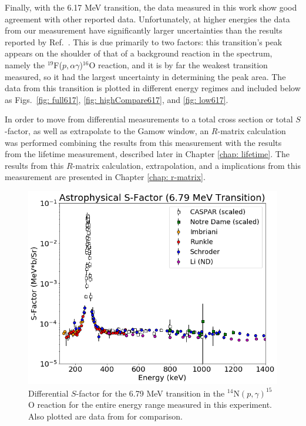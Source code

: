 Finally, with the 6.17 MeV transition, the data measured in this work show good agreement with other reported data. Unfortunately, at higher energies the data from our measurement have significantly larger uncertainties than the results reported by Ref.\ \cite{Schroder1987}. This is due primarily to two factors: this transition's peak appears on the shoulder of that of a background reaction in the spectrum, namely the $^{19}$F($p,\alpha \gamma$)$^{16}$O reaction, and it is by far the weakest transition measured, so it had the largest uncertainty in determining the peak area. The data from this transition is plotted in different energy regimes and included below as Figs.\ \ref{fig: full617}, \ref{fig: highCompare617}, and \ref{fig: low617}.

In order to move from differential measurements to a total cross section or total $S$-factor, as well as extrapolate to the Gamow window, an $R$-matrix calculation was performed combining the results from this measurement with the results from the lifetime measurement, described later in Chapter \ref{chap: lifetime}. The results from this $R$-matrix calculation, extrapolation, and a implications from this measurement are presented in Chapter \ref{chap: r-matrix}.





\begin{figure}
		\includegraphics[width=1.0\linewidth]{figures/full679.png}
	\caption{Differential $S$-factor for the 6.79 MeV transition in the $^{14}$N$\left( p,\gamma \right) ^{15}$O reaction for the entire energy range measured in this experiment. Also plotted are data from \cite{Schroder1987, Imbriani2005, Runkle2005, Li2016} for comparison.  }
	\label{fig: full679}
\end{figure}


